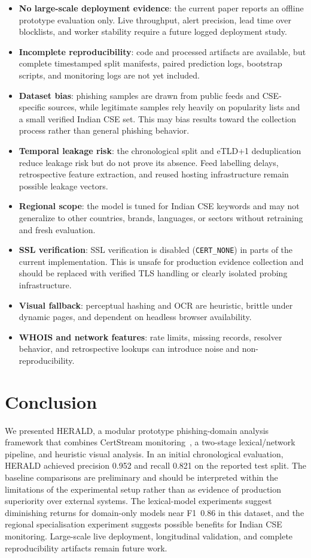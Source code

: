 \documentclass[conference]{IEEEtran}
\begin{document}
\begin{itemize}
    \item \textbf{No large-scale deployment evidence}: the current paper reports an offline prototype evaluation only. Live throughput, alert precision, lead time over blocklists, and worker stability require a future logged deployment study.
    \item \textbf{Incomplete reproducibility}: code and processed artifacts are available, but complete timestamped split manifests, paired prediction logs, bootstrap scripts, and monitoring logs are not yet included.
    \item \textbf{Dataset bias}: phishing samples are drawn from public feeds and CSE-specific sources, while legitimate samples rely heavily on popularity lists and a small verified Indian CSE set. This may bias results toward the collection process rather than general phishing behavior.
    \item \textbf{Temporal leakage risk}: the chronological split and eTLD+1 deduplication reduce leakage risk but do not prove its absence. Feed labelling delays, retrospective feature extraction, and reused hosting infrastructure remain possible leakage vectors.
    \item \textbf{Regional scope}: the model is tuned for Indian CSE keywords and may not generalize to other countries, brands, languages, or sectors without retraining and fresh evaluation.
    \item \textbf{SSL verification}: SSL verification is disabled (\texttt{CERT\_NONE}) in parts of the current implementation. This is unsafe for production evidence collection and should be replaced with verified TLS handling or clearly isolated probing infrastructure.
    \item \textbf{Visual fallback}: perceptual hashing and OCR are heuristic, brittle under dynamic pages, and dependent on headless browser availability.
    \item \textbf{WHOIS and network features}: rate limits, missing records, resolver behavior, and retrospective lookups can introduce noise and non-reproducibility.
\end{itemize}

\section{Conclusion}

We presented HERALD, a modular prototype phishing-domain analysis framework that combines CertStream monitoring~\cite{certstream}, a two-stage lexical/network pipeline, and heuristic visual analysis. In an initial chronological evaluation, HERALD achieved precision 0.952 and recall 0.821 on the reported test split. The baseline comparisons are preliminary and should be interpreted within the limitations of the experimental setup rather than as evidence of production superiority over external systems. The lexical-model experiments suggest diminishing returns for domain-only models near F1~0.86 in this dataset, and the regional specialisation experiment suggests possible benefits for Indian CSE monitoring. Large-scale live deployment, longitudinal validation, and complete reproducibility artifacts remain future work.
\end{document}

